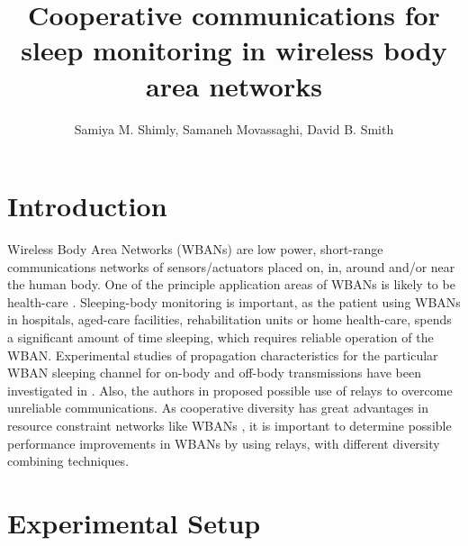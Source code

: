 \documentclass[twocolumn]{el-author}
\date{}
\begin{document}
\title{Cooperative communications for sleep monitoring in wireless body area networks}

\author{Samiya M. Shimly, Samaneh Movassaghi, David B. Smith}


\maketitle

\section{Introduction}

Wireless Body Area Networks (WBANs) are low power, short-range communications networks of sensors/actuators placed on, in, around and/or near the human body. One of the principle application areas of WBANs is likely to be health-care \cite{1}. Sleeping-body monitoring is important, as the patient using WBANs in hospitals, aged-care facilities, rehabilitation units or home health-care, spends a significant amount of time sleeping, which requires reliable operation of the WBAN.
  Experimental studies of propagation characteristics for the particular WBAN sleeping channel for on-body and off-body transmissions have been investigated in \cite{2}. Also, the authors in \cite{2} proposed possible use of relays to overcome unreliable communications. As cooperative diversity has great advantages in resource constraint networks like WBANs \cite{3}, it is important to determine possible performance improvements in WBANs by using relays, with different diversity combining techniques.
  
 \section{Experimental Setup}
\end{document}
